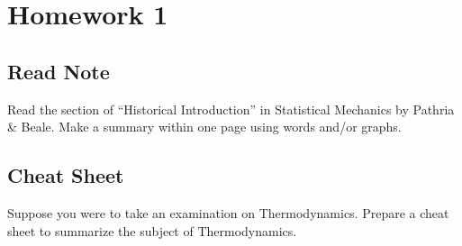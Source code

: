\documentclass[../../main.tex]{subfiles}
\begin{document}
\section{Homework 1}
\subsection{Read Note}
  Read the section of “Historical Introduction” in Statistical Mechanics by Pathria \& Beale. Make a summary within one page using words and/or graphs.
\subsection{Cheat Sheet}
  Suppose you were to take an examination on Thermodynamics. Prepare a cheat sheet to summarize the subject of Thermodynamics.
\end{document}
